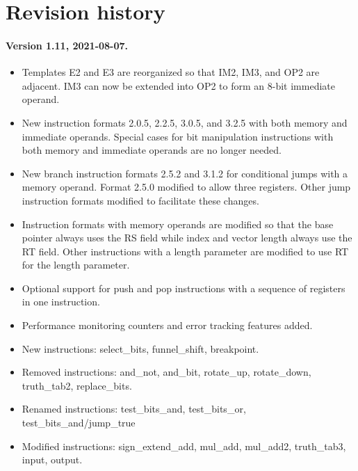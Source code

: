 \documentclass[forwardcom.tex]{subfiles}
\begin{document}
\RaggedRight

\chapter{Revision history}

\subsubsection{Version 1.11, 2021-08-07.}

\begin{itemize}
\item Templates E2 and E3 are reorganized so that IM2, IM3, and OP2 are adjacent. IM3 can now be extended into OP2 to form an 8-bit immediate operand.

\item New instruction formats 2.0.5, 2.2.5, 3.0.5, and 3.2.5 with both memory and immediate operands. Special cases for bit manipulation instructions with both memory and immediate operands are no longer needed.

\item New branch instruction formats 2.5.2 and 3.1.2 for conditional jumps with a memory operand. Format 2.5.0 modified to allow three registers. Other jump instruction formats modified to facilitate these changes.

\item Instruction formats with memory operands are modified so that the base pointer always uses the RS field while index and vector length always use the RT field. Other instructions with a length parameter are modified to use RT for the length parameter.

\item Optional support for push and pop instructions with a sequence of registers in one instruction.

\item Performance monitoring counters and error tracking features added.

\item New instructions: select\_bits, funnel\_shift, breakpoint.

\item Removed instructions: and\_not, and\_bit, rotate\_up, rotate\_down, truth\_tab2, replace\_bits.

\item Renamed instructions: test\_bits\_and, test\_bits\_or, test\_bits\_and/jump\_true

\item Modified instructions: sign\_extend\_add, mul\_add, mul\_add2, truth\_tab3, input, output.


\end{itemize}
\end{document}
